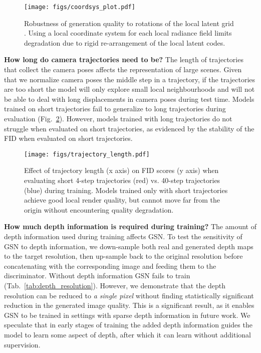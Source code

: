 \documentclass[10pt,twocolumn,letterpaper]{article}
\begin{document}
\begin{figure}[t]
    \centering
    \texttt{[image: figs/coordsys\_plot.pdf]}
    \caption{Robustness of generation quality \wrt to rotations of the local latent grid . Using a local coordinate system for each local radiance field 
    limits degradation due to rigid re-arrangement of the local latent codes.
    }
    \label{fig:coordinate_system}
\end{figure}

\textbf{How long do camera trajectories need to be?} The length of trajectories that collect the camera poses affects the representation of large scenes. Given that we normalize camera poses \wrt the middle step in a trajectory, if the trajectories are too short the model will only explore small local neighbourhoods and will not be able to deal with long displacements in camera poses during test time. Models trained on short trajectories fail to generalize to long trajectories during evaluation (Fig.~\ref{fig:trajectory_length}). However, models trained with long trajectories do not struggle when evaluated on short trajectories, as evidenced by the stability of the FID when evaluated on short trajectories.

\begin{figure}[h]
    \centering
    \texttt{[image: figs/trajectory\_length.pdf]}
    \caption{Effect of trajectory length (x axis) on FID scores (y axis) when evaluating short 4-step trajectories (red) vs. 40-step trajectories (blue) during training. Models trained only with short trajectories achieve good local render quality, but cannot move far from the origin without encountering quality degradation.}
    \label{fig:trajectory_length}
\end{figure}

\textbf{How much depth information is required during training?} The amount of depth information used during training affects GSN. To test the sensitivity of GSN to depth information, we down-sample both real and generated depth maps to the target resolution, then up-sample back to the original resolution before concatenating with the corresponding image and feeding them to the discriminator. Without depth information GSN fails to train (Tab.~\ref{tab:depth_resolution}). However, we demonstrate that the depth resolution can be reduced to \textit{a single pixel} without finding statistically significant reduction in the generated image quality. This is a significant  result, as it enables GSN to be trained in settings with sparse depth information in future work. We speculate that in early stages of training the added depth information guides the model to learn some aspect of depth, after which it can learn without additional supervision. 
\end{document}
